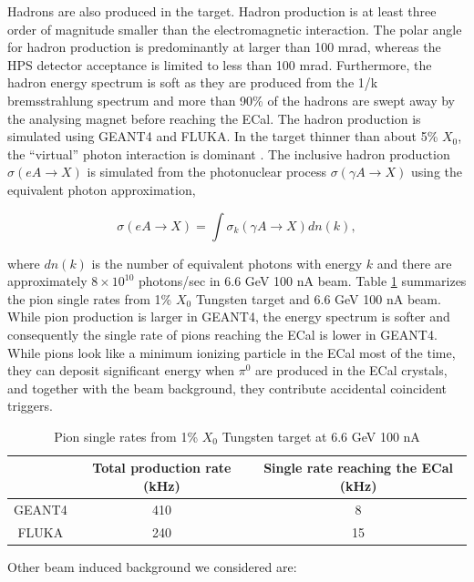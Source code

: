 Hadrons are also produced in the target. Hadron production is at least three order
of magnitude smaller than the electromagnetic interaction. The polar angle for hadron production
is predominantly at larger than 100 mrad, whereas the HPS detector acceptance is limited to less than
100 mrad. Furthermore, the hadron energy spectrum is soft as they are produced from the 1/k bremsstrahlung
spectrum and more than 90\% of the hadrons are swept away by the analysing magnet before reaching the ECal.
 The hadron production is simulated using GEANT4 and FLUKA. In the target thinner than
about 5\% $X_0$, the ``virtual'' photon interaction is dominant \cite{mohring}. The inclusive hadron
production ${\sigma (eA\rightarrow X)}$ is simulated from the photonuclear process ${\sigma (\gamma A
\rightarrow X)}$ using the equivalent photon approximation,

$$ \sigma (eA \rightarrow X) = \int \sigma_k(\gamma A \rightarrow X) dn(k), $$

\noindent
where $dn(k)$ is the number of equivalent photons with energy $k$ \cite{budnev} and there are 
approximately $8 \times 10^{10} $ photons/sec in 6.6 GeV 100 nA beam. 
Table \ref{tab:pion} summarizes the pion single rates from 1\% $X_0$ Tungsten target
and 6.6 GeV 100 nA beam. While pion production is larger in GEANT4, the energy spectrum is softer and
consequently the single rate of pions reaching the ECal is lower in GEANT4. While pions look like a minimum 
ionizing particle in the ECal most of the time, they can deposit significant energy when ${\pi^0}$ are
produced in the ECal crystals, and together with the beam background, they contribute accidental coincident triggers. 

\begin{table}[h]
\begin{center}
\begin{tabular}{|c|c|c|} \hline
  & Total production rate (kHz) & Single rate reaching the ECal (kHz) \\ \hline
GEANT4 & 410 & 8 \\ \hline
FLUKA  & 240 & 15 \\ \hline
\end{tabular}
\end{center}
\caption{\small{Pion single rates from 1\% $X_0$ Tungsten target at 6.6 GeV 100 nA}}
\label{tab:pion}
\end{table}

\pagebreak
\noindent
Other beam induced background we considered are:

